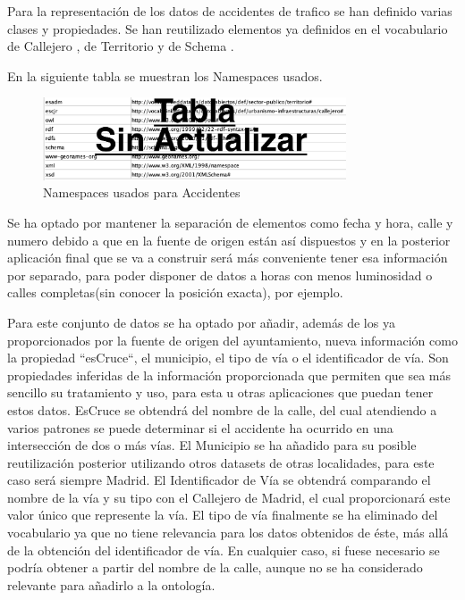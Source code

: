 Para la representación de los datos de accidentes de trafico se han definido varias clases y propiedades. Se han reutilizado elementos ya definidos en el vocabulario de Callejero \cite{ciudadesbiertas_callejero}, de Territorio \cite{datoabiertos_municipio} y de Schema \cite{schema_org}.

\clearpage
En la siguiente tabla se muestran los Namespaces usados.

\begin{figure}[h]
	\centering
		\includegraphics[angle=0, width=0.8\textwidth]{images/tablaIRIsAccidentesBici.png}  
	\caption{Namespaces usados para Accidentes}
\end{figure}




Se ha optado por mantener la separación de elementos como fecha y hora, calle y numero debido a que en la fuente de origen están así dispuestos y en la posterior aplicación final que se va a construir será más conveniente tener esa información por separado, para poder disponer de datos a horas con menos luminosidad o calles completas(sin conocer la posición exacta), por ejemplo.


Para este conjunto de datos se ha optado por añadir, además de los ya proporcionados por la fuente de origen del ayuntamiento, nueva información como la propiedad ``esCruce``, el municipio, el tipo de vía o el identificador de vía. Son propiedades inferidas de la información proporcionada que permiten que sea más sencillo su tratamiento y uso, para esta u otras aplicaciones que puedan tener estos datos.
EsCruce se obtendrá del nombre de la calle, del cual atendiendo a varios patrones se puede determinar si el accidente ha ocurrido en una intersección de dos o más vías.
El Municipio se ha añadido para su posible reutilización posterior utilizando otros datasets de otras localidades, para este caso será siempre Madrid.
El Identificador de Vía se obtendrá comparando el nombre de la vía y su tipo con el Callejero de Madrid, el cual proporcionará este valor único que represente la vía.
El tipo de vía finalmente se ha eliminado del vocabulario ya que no tiene relevancia para los datos obtenidos de éste, más allá de la obtención del identificador de vía. En cualquier caso, si fuese necesario se podría obtener a partir del nombre de la calle, aunque no se ha considerado relevante para añadirlo a la ontología.


